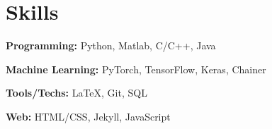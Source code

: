 
\section{Skills}

\begin{denseouterlist}
\item \textbf{Programming:} Python, Matlab, C/C++, Java
\item \textbf{Machine Learning:} PyTorch, TensorFlow, Keras, Chainer
\item \textbf{Tools/Techs:} LaTeX, Git, SQL
\item \textbf{Web:} HTML/CSS, Jekyll, JavaScript
\end{denseouterlist}
